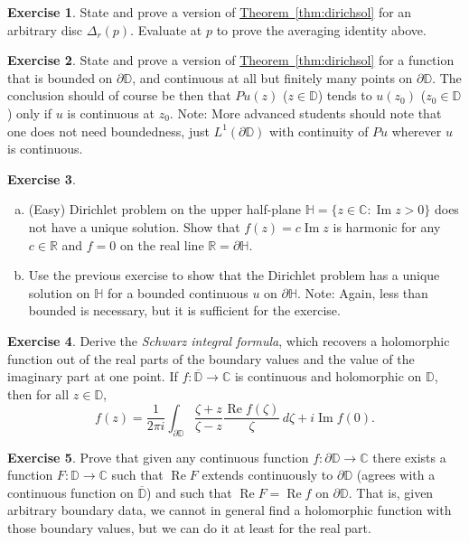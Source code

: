 \documentclass[12pt,openany]{book}
\renewcommand{\Re}{\operatorname{Re}}
\renewcommand{\Im}{\operatorname{Im}}
\newcommand{\C}{{\mathbb{C}}}
\newcommand{\R}{{\mathbb{R}}}
\newcommand{\D}{{\mathbb{D}}}
\newcommand{\bH}{{\mathbb{H}}}
\newcommand{\myindex}[1]{#1\index{#1}}
\theoremstyle{plain}
\theoremstyle{remark}
\theoremstyle{definition}
\newenvironment{exbox}{%
    \def\FrameCommand{\vrule width 1pt \relax\hspace {10pt}}%
    \MakeFramed {\advance \hsize -\width \FrameRestore }%
}{%
    \endMakeFramed
}
\newenvironment{exparts}{%
    \leavevmode\begin{enumerate}[a),noitemsep,topsep=0pt,parsep=0pt,partopsep=0pt]
}{%
    \end{enumerate}
}
\theoremstyle{exercise}
\newtheorem{exercise}{Exercise}[section]
\theoremstyle{example}
\newcommand{\thmref}[1]{\hyperref[#1]{Theorem~\ref*{#1}}}
\begin{document}
\begin{exbox}
\begin{exercise}
State and prove a version of \thmref{thm:dirichsol} for an arbitrary disc
$\Delta_r(p)$.  Evaluate at $p$ to prove the averaging identity above.
\end{exercise}

\begin{exercise}
State and prove a version of \thmref{thm:dirichsol} for a function that is
bounded on $\partial \D$, and continuous at all but finitely many points on
$\partial \D$.  The conclusion should of course be then that $Pu(z)$ ($z \in
\D$) tends
to $u(z_0)$ ($z_0 \in \D$) only if $u$ is continuous at $z_0$.
Note: More advanced students should note that one does not need boundedness,
just $L^1(\partial \D)$ with continuity of $Pu$ wherever $u$ is continuous.
\end{exercise}

\begin{exercise}
\begin{exparts}
\item (Easy)
Dirichlet problem on the upper half-plane $\bH = \{ z \in \C : \Im z > 0 \}$
does not have a unique solution.  Show that $f(z) = c \Im z$ is harmonic for
any $c \in \R$ and $f = 0$ on the real line $\R = \partial \bH$.
\item 
Use the previous exercise to show that the Dirichlet problem has a unique
solution on $\bH$ for a bounded continuous $u$ on $\partial \bH$.
Note: Again, less than bounded is
necessary, but it is sufficient for the exercise.
\end{exparts}
\end{exercise}

\begin{exercise}
Derive the \emph{\myindex{Schwarz integral formula}}, which recovers
a holomorphic function out of the real parts of the boundary values
and the value of the imaginary part at one point.
If $f \colon \overline{\D} \to \C$ is continuous and holomorphic on
$\D$, then for all $z \in \D$,
\begin{equation*}
f(z) =
\frac{1}{2\pi i}
\int_{\partial \D}
\frac{\zeta+z}{\zeta-z} \frac{\Re f(\zeta)}{\zeta} \, d\zeta
+ i \Im f(0) .
\end{equation*}
\end{exercise}

\begin{exercise}
Prove that given any continuous function $f \colon \partial \D \to \C$
there exists a function $F \colon \D \to \C$ such that $\Re F$ extends
continuously to $\partial \D$ (agrees with a continuous function on
$\overline{\D}$) and such that $\Re F = \Re f$ on $\partial \D$.
That is, given arbitrary boundary data, we cannot in general find a
holomorphic function with those boundary values, but we can do it at least
for the real part.
\end{exercise}
\end{exbox}
\end{document}
